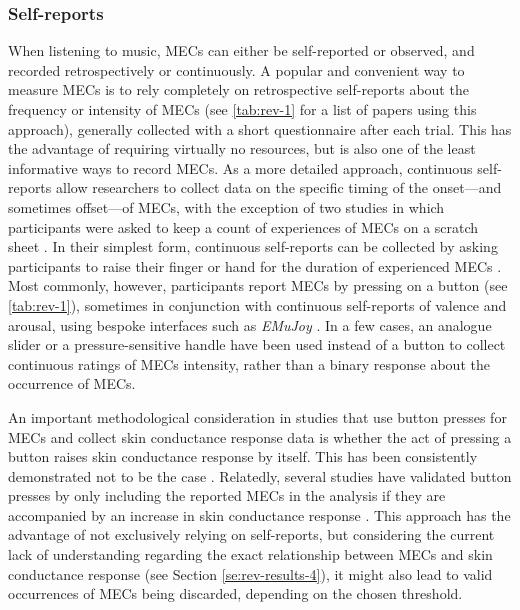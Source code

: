 \subsubsection{Self-reports}

When listening to music, MECs can either be self-reported or observed, and recorded retrospectively or continuously. A popular and convenient way to measure MECs is to rely completely on retrospective self-reports about the frequency or intensity of MECs (see \autoref{tab:rev-1} for a list of papers using this approach), generally collected with a short questionnaire after each trial. This has the advantage of requiring virtually no resources, but is also one of the least informative ways to record MECs. As a more detailed approach, continuous self-reports allow researchers to collect data on the specific timing of the onset---and sometimes offset---of MECs, with the exception of two studies in which participants were asked to keep a count of experiences of MECs on a scratch sheet \parencite{baltes2011, baltes2014}. In their simplest form, continuous self-reports can be collected by asking participants to raise their finger or hand for the duration of experienced MECs \parencite{craig2005, goldstein1980, konecni2007b, panksepp1995}. Most commonly, however, participants report MECs by pressing on a button (see \autoref{tab:rev-1}), sometimes in conjunction with continuous self-reports of valence and arousal, using bespoke interfaces such as \emph{EMuJoy} \parencite{nagel2007}. In a few cases, an analogue slider \parencite{bannister2018} or a pressure-sensitive handle \parencite{grunkina2017, klepzig2020} have been used instead of a button to collect continuous ratings of MECs intensity, rather than a binary response about the occurrence of MECs.

An important methodological consideration in studies that use button presses for MECs and collect skin conductance response data is whether the act of pressing a button raises skin conductance response by itself. This has been consistently demonstrated not to be the case \parencite{bannister2020b, colver2016, grewe2007, grewe2009a, grewe2011, guhn2007, mori2014b, mori2015, rickard2004, salimpoor2009}. Relatedly, several studies have validated button presses by only including the reported MECs in the analysis if they are accompanied by an increase in skin conductance response \parencite{bannister2020b, beier2020, colver2016, egermann2011, grewe2007, mori2014b}. This approach has the advantage of not exclusively relying on self-reports, but considering the current lack of understanding regarding the exact relationship between MECs and skin conductance response (see Section \ref{se:rev-results-4}), it might also lead to valid occurrences of MECs being discarded, depending on the chosen threshold.

